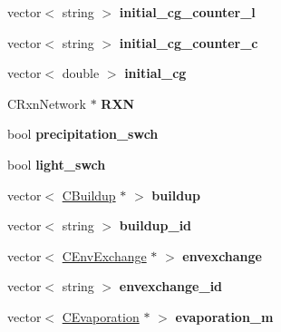 \begin{DoxyCompactItemize}
\mbox{\label{class_c_m_b_block_a4b70b68374d48179de1cb2187205af59}} 
vector$<$ string $>$ {\bfseries initial\+\_\+cg\+\_\+counter\+\_\+l}
\item 
\mbox{\label{class_c_m_b_block_a5ead61254628b0227ce38101c2f7fd90}} 
vector$<$ string $>$ {\bfseries initial\+\_\+cg\+\_\+counter\+\_\+c}
\item 
\mbox{\label{class_c_m_b_block_aaaa3f64c6c399a7afaf5188d8ee9c160}} 
vector$<$ double $>$ {\bfseries initial\+\_\+cg}
\item 
\mbox{\label{class_c_m_b_block_a97b417dafe512fe1f4b8e90e444daac3}} 
C\+Rxn\+Network $\ast$ {\bfseries R\+XN}
\item 
\mbox{\label{class_c_m_b_block_aa1111eb8dd4fa1928035625ebcbe08f8}} 
bool {\bfseries precipitation\+\_\+swch}
\item 
\mbox{\label{class_c_m_b_block_ab5e0ceedff1da61037faebe204b0ada6}} 
bool {\bfseries light\+\_\+swch}
\item 
\mbox{\label{class_c_m_b_block_af6f373346a298990d14aa0090a771fab}} 
vector$<$ \hyperlink{class_c_buildup}{C\+Buildup} $\ast$ $>$ {\bfseries buildup}
\item 
\mbox{\label{class_c_m_b_block_a5fb1b5c7893903e293d6ed785be7d4ec}} 
vector$<$ string $>$ {\bfseries buildup\+\_\+id}
\item 
\mbox{\label{class_c_m_b_block_a646db99d98682713a8c9ad58887d7056}} 
vector$<$ \hyperlink{class_c_env_exchange}{C\+Env\+Exchange} $\ast$ $>$ {\bfseries envexchange}
\item 
\mbox{\label{class_c_m_b_block_aba1d4e6662f82006db5f28015c4a0474}} 
vector$<$ string $>$ {\bfseries envexchange\+\_\+id}
\item 
\mbox{\label{class_c_m_b_block_a84e9a339bf0e765ab9e914268e986571}} 
vector$<$ \hyperlink{class_c_evaporation}{C\+Evaporation} $\ast$ $>$ {\bfseries evaporation\+\_\+m}

\end{DoxyCompactItemize}
